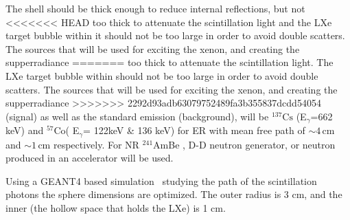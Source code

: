 The shell should be thick enough to reduce internal reflections, but not 
<<<<<<< HEAD
too thick to attenuate the scintillation light and the LXe target bubble within it should not be too large in order to avoid double scatters. 
The sources that will be used for exciting the xenon, and creating the supperradiance 
=======
too thick to attenuate the scintillation light. The LXe target bubble within should not be too large in order to avoid double scatters. The sources that will be used for exciting the xenon, and creating the supperradiance 
>>>>>>> 2292d93adb63079752489fa3b355837dcdd54054
(signal) as well as the standard emission (background), will be $^{137} \mathrm{Cs}$ 
(E$_\gamma$=662 keV) and $^{57} \mathrm{Co}$( E$_\gamma$= 122keV \& 136 keV) for ER with mean free path of $\sim4$\,cm and $\sim1$\,cm respectively. For NR $^{241}$AmBe , 
D-D neutron generator, or neutron produced in an accelerator will be used.

Using a GEANT4 based simulation~\cite{AGOSTINELLI2003250} studying the path of the scintillation photons the sphere dimensions are optimized. 
The outer radius  is 3 cm, and the inner (the hollow space that holds the LXe) is 1 cm. 
